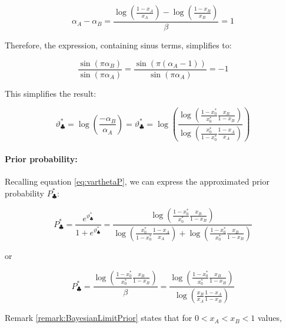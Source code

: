 \documentclass{article}
\theoremstyle{definition}
\begin{document}
\begin{equation}
    \alpha_A - \alpha_B = 
    \frac{\log \left ( \frac{1-x_A}{x_A} \right ) - \log \left ( \frac{1-x_B}{x_B} \right )}{\beta} = 1
\end{equation}

Therefore, the expression, containing sinus terms, simplifies to:

\begin{equation}
    \frac{\sin(\pi \alpha_B)}{\sin(\pi \alpha_A)} = 
    \frac{\sin(\pi (\alpha_A - 1))}{\sin(\pi \alpha_A)} = -1
\end{equation}

This simplifies the result:

\begin{equation}
    \vartheta^*_\clubsuit = \log \left (  \frac{-\alpha_B}{\alpha_A}  \right )
    =
    \vartheta^*_\clubsuit = \log \left (  \frac{
    \log \left ( \frac{1-x_0^*}{x_0^*} \frac{x_B}{1-x_B} \right )
    }{
    \log \left ( \frac{x_0^*}{1-x_0^*} \frac{1-x_A}{x_A} \right )
    }  \right )
\end{equation}

\paragraph{Prior probability:}

Recalling equation \eqref{eq:varthetaP}, we can express the approximated prior probability $P^*_\clubsuit$:

\begin{equation}
    P^*_\clubsuit = \frac{e^{\vartheta^*_\clubsuit}}{1+e^{\vartheta^*_\clubsuit}}
    =
    \frac{
    \log \left ( \frac{1-x_0^*}{x_0^*} \frac{x_B}{1-x_B} \right )
    }
    {
    \log \left ( \frac{x_0^*}{1-x_0^*} \frac{1-x_A}{x_A} \right ) +
    \log \left ( \frac{1-x_0^*}{x_0^*} \frac{x_B}{1-x_B} \right )
    }
\end{equation}

or

\begin{equation}
\label{eq:P*_club}
    P^*_\clubsuit = \frac{
    \log \left ( \frac{1-x_0^*}{x_0^*} \frac{x_B}{1-x_B} \right )
    }
    {
    \beta
    } = 
    \frac{
    \log \left ( \frac{1-x_0^*}{x_0^*} \frac{x_B}{1-x_B} \right )
    }
    {
    \log \left ( \frac{x_B}{x_A} \frac{1-x_A}{1-x_B} \right )
    }
\end{equation}

Remark \ref{remark:BayesianLimitPrior} states that for $0<x_A<x_B<1$ values,
\end{document}
